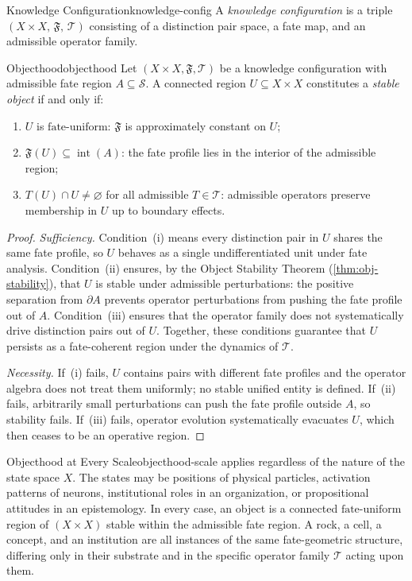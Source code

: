 \documentclass[12pt,twoside,openright]{book}
\newcommand{\transfam}{\mathcal{T}}       %
\newcommand{\fateMap}{\mathfrak{F}}
\newcommand{\fateSpace}{\mathcal{S}}
\newcommand{\admRegion}{A}
\newcommand{\fateUnif}{\text{fate-uniform}}
\providecommand{\admRegion}{A}
\providecommand{\fateUnif}{\text{fate-uniform}}
\begin{document}
\begin{definition}{Knowledge Configuration}{knowledge-config}
A \emph{knowledge configuration} is a triple
$(X\times X,\, \fateMap,\, \transfam)$ consisting of a
distinction pair space, a fate map, and an admissible operator
family.
\end{definition}

\begin{theorem}{Objecthood}{objecthood}
Let $(X\times X, \fateMap, \transfam)$ be a knowledge
configuration with admissible fate region
$\admRegion\subseteq\fateSpace$.
A connected region $U\subseteq X\times X$ constitutes a
\emph{stable object} if and only if:
\begin{enumerate}[nosep,label=(\roman*)]
  \item $U$ is $\fateUnif$: $\fateMap$ is approximately
    constant on $U$;
  \item $\fateMap(U)\subseteq\operatorname{int}(\admRegion)$:
    the fate profile lies in the interior of the admissible
    region;
  \item $T(U)\cap U \neq\varnothing$ for all admissible
    $T\in\transfam$: admissible operators preserve membership
    in $U$ up to boundary effects.
\end{enumerate}
\begin{proof}
\emph{Sufficiency.} Condition~(i) means every distinction pair
in $U$ shares the same fate profile, so $U$ behaves as a
single undifferentiated unit under fate analysis.
Condition~(ii) ensures, by the Object Stability Theorem
(\cref{thm:obj-stability}), that $U$ is stable under
admissible perturbations: the positive separation from
$\partial\admRegion$ prevents operator perturbations from
pushing the fate profile out of $\admRegion$.
Condition~(iii) ensures that the operator family does not
systematically drive distinction pairs out of $U$.
Together, these conditions guarantee that $U$ persists as a
fate-coherent region under the dynamics of $\transfam$.

\emph{Necessity.} If~(i) fails, $U$ contains pairs with
different fate profiles and the operator algebra does not
treat them uniformly; no stable unified entity is defined.
If~(ii) fails, arbitrarily small perturbations can push the
fate profile outside $\admRegion$, so stability fails.
If~(iii) fails, operator evolution systematically evacuates
$U$, which then ceases to be an operative region.
\end{proof}
\end{theorem}

\begin{remark}{Objecthood at Every Scale}{objecthood-scale}
 applies regardless of the nature of the
state space $X$. The states may be positions of physical
particles, activation patterns of neurons, institutional roles
in an organization, or propositional attitudes in an
epistemology. In every case, an object is a connected
$\fateUnif$ region of $(X\times X)$ stable within the
admissible fate region. A rock, a cell, a concept, and an
institution are all instances of the same fate-geometric
structure, differing only in their substrate and in the
specific operator family $\transfam$ acting upon them.
\end{remark}
\end{document}
